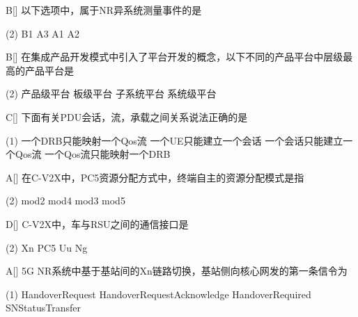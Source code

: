 \begin{choice}{B}[]
    以下选项中，属于NR异系统测量事件的是
    \begin{tasks}(2)
        \task B1
        \task A3
        \task A1
        \task A2
    \end{tasks}
\end{choice}

\begin{choice}{B}[]
    在集成产品开发模式中引入了平台开发的概念，以下不同的产品平台中层级最高的产品平台是
    \begin{tasks}(2)
        \task 产品级平台
        \task 板级平台
        \task  子系统平台
        \task 系统级平台
    \end{tasks}
\end{choice}


\begin{choice}{C}[]
    下面有关PDU会话，流，承载之间关系说法正确的是
    \begin{tasks}(1)
        \task 一个DRB只能映射一个Qos流
        \task 一个UE只能建立一个会话
        \task 一个会话只能建立一个Qos流
        \task 一个Qos流只能映射一个DRB
    \end{tasks}
\end{choice}


\begin{choice}{A}[]
    在C-V2X中，PC5资源分配方式中，终端自主的资源分配模式是指
    \begin{tasks}(2)
        \task mod2
        \task mod4
        \task mod3
        \task mod5
    \end{tasks}
\end{choice}



\begin{choice}{D}[]
    C-V2X中，车与RSU之间的通信接口是
    \begin{tasks}(2)
        \task Xn
        \task PC5
        \task Uu
        \task Ng
    \end{tasks}
\end{choice}


\begin{choice}{A}[]
    5G NR系统中基于基站间的Xn链路切换，基站侧向核心网发的第一条信令为
    \begin{tasks}(1)
        \task HandoverRequest
        \task HandoverRequestAcknowledge
        \task HandoverRequired
        \task SNStatusTransfer
    \end{tasks}
\end{choice}


